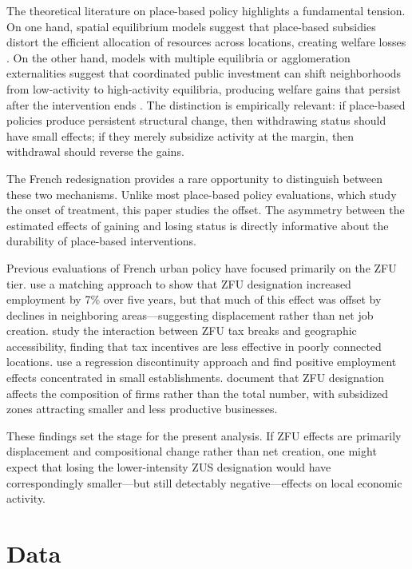 \documentclass[12pt]{article}
\begin{document}
The theoretical literature on place-based policy highlights a fundamental tension. On one hand, spatial equilibrium models suggest that place-based subsidies distort the efficient allocation of resources across locations, creating welfare losses \citep{glaeser2008poor}. On the other hand, models with multiple equilibria or agglomeration externalities suggest that coordinated public investment can shift neighborhoods from low-activity to high-activity equilibria, producing welfare gains that persist after the intervention ends \citep{benabou1993workings, kline2013place}. The distinction is empirically relevant: if place-based policies produce persistent structural change, then withdrawing status should have small effects; if they merely subsidize activity at the margin, then withdrawal should reverse the gains.

The French redesignation provides a rare opportunity to distinguish between these two mechanisms. Unlike most place-based policy evaluations, which study the onset of treatment, this paper studies the offset. The asymmetry between the estimated effects of gaining and losing status is directly informative about the durability of place-based interventions.

Previous evaluations of French urban policy have focused primarily on the ZFU tier. \citet{mayer2017effects} use a matching approach to show that ZFU designation increased employment by 7\% over five years, but that much of this effect was offset by declines in neighboring areas---suggesting displacement rather than net job creation. \citet{briant2015railroad} study the interaction between ZFU tax breaks and geographic accessibility, finding that tax incentives are less effective in poorly connected locations. \citet{givord2013zones} use a regression discontinuity approach and find positive employment effects concentrated in small establishments. \citet{ehrlich2018sorting} document that ZFU designation affects the composition of firms rather than the total number, with subsidized zones attracting smaller and less productive businesses.

These findings set the stage for the present analysis. If ZFU effects are primarily displacement and compositional change rather than net creation, one might expect that losing the lower-intensity ZUS designation would have correspondingly smaller---but still detectably negative---effects on local economic activity.


\section{Data}
\end{document}

